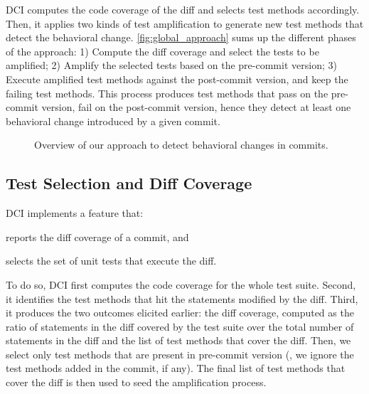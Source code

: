 DCI computes the code coverage of the diff and selects test methods accordingly. %
Then, it applies two kinds of test amplification to generate new test methods that detect the behavioral change.
%
\autoref{fig:global_approach} sums up the different phases of the approach:
1) Compute the diff coverage and select the tests to be amplified;
2) Amplify the selected tests based on the pre-commit version;
3) Execute amplified test methods against the post-commit version, and keep the failing test methods.
This process produces test methods that pass on the pre-commit version, fail on the post-commit version, hence they detect at least one behavioral change introduced by a given commit.

\begin{figure}
    \caption{Overview of our approach to detect behavioral changes in commits.}
    \label{fig:global_approach}
\end{figure}

\subsection{Test Selection and Diff Coverage}
\label{subsec:compute_diff_coverage}
DCI implements a feature that:
\begin{enumerate*}
\item reports the diff coverage of a commit, and
\item selects the set of unit tests that execute the diff.
\end{enumerate*}
%
To do so, DCI first computes the code coverage for the whole test suite.
Second, it identifies the test methods that hit the statements modified by the diff. 
Third, it produces the two outcomes elicited earlier: the diff coverage, computed as the ratio of statements in the diff covered by the test suite over the total number of statements in the diff and the list of test methods that cover the diff.
%
Then, we select only test methods that are present in pre-commit version (\ie, we ignore the test methods added in the commit, if any).
The final list of test methods that cover the diff is then used to seed the amplification process.

